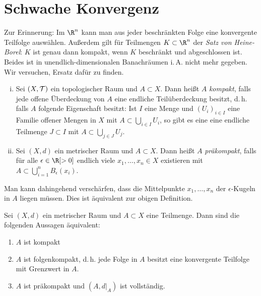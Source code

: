 \chapter{Schwache Konvergenz}
Zur Erinnerung: Im $\R^n$ kann man aus jeder beschränkten Folge eine konvergente
Teilfolge auswählen. Außerdem gilt für Teilmengen $K\subset\R^n$ der
\emph{Satz von Heine-Borel}: $K$ ist genau dann kompakt, wenn $K$ beschränkt und
abgeschlossen ist. Beides ist in unendlich-dimensionalen Banachräumen i.\,A.
nicht mehr gegeben. Wir versuchen, Ersatz dafür zu finden.

\thmmanualindex%
\begin{thDef} \label{vl15:def:7.1}\hfill
    \begin{enumerate}[(i)]
        \item
            Sei $(X,\operatorname{\mathcal{T}})$ ein topologischer Raum und $A\subset X$.
            Dann heißt $A$ \emph{kompakt}, falls jede offene Überdeckung von
            $A$ eine endliche Teilüberdeckung besitzt, d.\,h. falls $A$ folgende
            Eigenschaft besitzt:
            Ist $I$ eine Menge und $(U_i)_{i\in I}$ eine Familie offener Mengen
            in $X$ mit $A\subset \bigcup_{i\in I} U_i$, so gibt es eine eine
            endliche Teilmenge $J\subset I$ mit $A\subset \bigcup_{j\in J} U_j$.
            
        \item \label{vl15:def:7.1:ii}
            Sei $(X,d)$ ein metrischer Raum und $A\subset X$. Dann heißt $A$
            \emph{präkompakt}, falls für alle $\epsilon\in\R[>0]$ endlich viele
            $x_1,\dots,x_n\in X$ existieren mit $A\subset\bigcup_{i=1}^n
            B_\epsilon(x_i)$.
    \end{enumerate}
\end{thDef}

\nnBemerkung
Man kann  dahingehend verschärfen, dass die Mittelpunkte
$x_1,\dots,x_n$ der $\epsilon$-Kugeln in $A$ liegen müssen. Dies ist äquivalent
zur obigen Definition.

\begin{thSatz} \label{vl15:satz7.2}
    Sei $(X,d)$ ein metrischer Raum und $A\subset X$ eine Teilmenge. Dann sind
    die folgenden Aussagen äquivalent:
    \begin{enumerate}[(1)]
        \item \label{vl15:satz7.2:1}
            $A$ ist kompakt
        
        \item \label{vl15:satz7.2:2}
            $A$ ist folgenkompakt, d.\,h. jede Folge in $A$
            besitzt eine konvergente Teilfolge mit Grenzwert in $A$.
            
        \item \label{vl15:satz7.2:3}
            $A$ ist präkompakt und $(A,d\vert_A)$ ist vollständig.
    \end{enumerate}
\end{thSatz}


